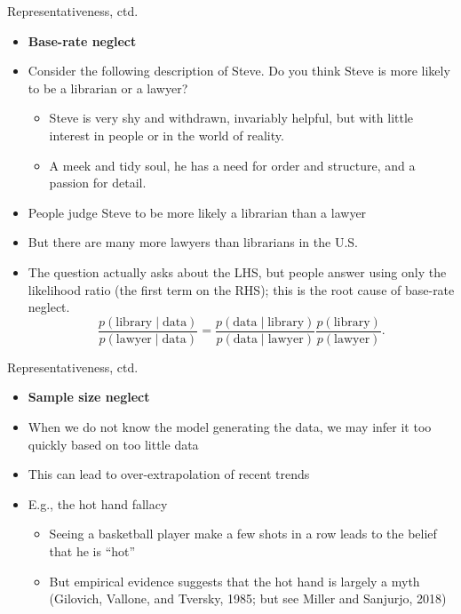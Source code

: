 \documentclass[aspectratio=169, 11pt]{beamer}
\begin{document}
\begin{frame}{Representativeness, ctd.}
\begin{itemize}
\item \textbf{Base-rate neglect}
\item Consider the following description of Steve. Do you think Steve is more likely to be a librarian or a lawyer?
  \begin{itemize}
  \item Steve is very shy and withdrawn, invariably helpful, but with little interest in people or in the world of reality.
  \item A meek and tidy soul, he has a need for order and structure, and a passion for detail.
  \end{itemize}
\item People judge Steve to be more likely a librarian than a lawyer
\item But there are many more lawyers than librarians in the U.S.
\item The question actually asks about the LHS, but people answer using only the likelihood ratio (the first term on the RHS); this is the root cause of base-rate neglect.
\[
\frac{p(\text{library}\mid\text{data})}{p(\text{lawyer}\mid\text{data})}
=
\frac{p(\text{data}\mid\text{library})}{p(\text{data}\mid\text{lawyer})}
\frac{p(\text{library})}{p(\text{lawyer})}.
\] 
\end{itemize}
\end{frame}

\begin{frame}{Representativeness, ctd.}
\begin{itemize}
\item \textbf{Sample size neglect}
\item When we do not know the model generating the data, we may infer it too quickly based on too little data
\item This can lead to over-extrapolation of recent trends
\item E.g., the hot hand fallacy
  \begin{itemize}
  \item Seeing a basketball player make a few shots in a row leads to the belief that he is ``hot''
  \item But empirical evidence suggests that the hot hand is largely a myth (Gilovich, Vallone, and Tversky, 1985; but see Miller and Sanjurjo, 2018)
  \end{itemize}
\end{itemize}
\end{frame}
\end{document}
